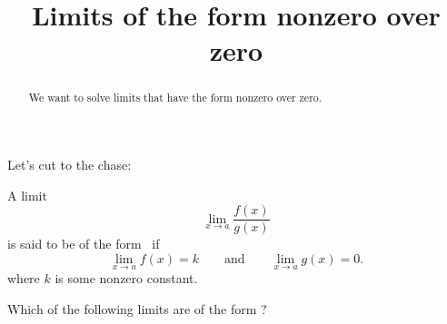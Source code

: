 \documentclass{ximera}
\title[Dig-In:]{Limits of the form nonzero over zero}
\begin{document}
\begin{abstract}
  We want to solve limits that have the form nonzero over zero.
\end{abstract}

\maketitle

Let's cut to the chase:

\begin{definition}
  A limit
  \[
  \lim_{x\to a} \frac{f(x)}{g(x)}
  \]
  is said to be of the form \numOverZero\ if
  \[
  \lim_{x\to a} f(x) = k\qquad\text{and}\qquad \lim_{x\to a} g(x) =0.
  \]
  where $k$ is some nonzero constant.
\end{definition}

\begin{question}
  Which of the following limits are of the form \numOverZero?
  \begin{selectAll}
  \end{selectAll}
\end{question}
\end{document}
